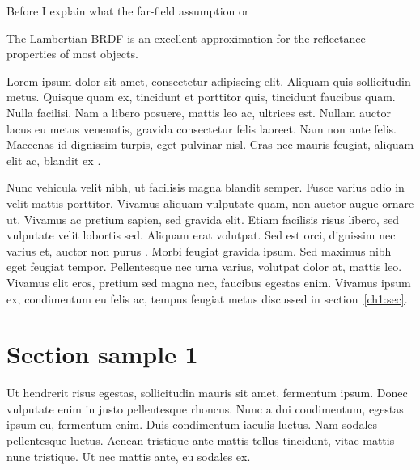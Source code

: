     Before I explain what the far-field assumption or 
    
    
    
    






    





The Lambertian BRDF is an excellent approximation for the reflectance properties of most objects.









Lorem ipsum dolor sit amet, consectetur adipiscing elit. Aliquam quis sollicitudin metus. Quisque quam ex, tincidunt et porttitor quis, tincidunt faucibus quam. Nulla facilisi. Nam a libero posuere, mattis leo ac, ultrices est. Nullam auctor lacus eu metus venenatis, gravida consectetur felis laoreet. Nam non ante felis. Maecenas id dignissim turpis, eget pulvinar nisl. Cras nec mauris feugiat, aliquam elit ac, blandit ex \cite{article-full}.

Nunc vehicula velit nibh, ut facilisis magna blandit semper. Fusce varius odio in velit mattis porttitor. Vivamus aliquam vulputate quam, non auctor augue ornare ut. Vivamus ac pretium sapien, sed gravida elit. Etiam facilisis risus libero, sed vulputate velit lobortis sed. Aliquam erat volutpat. Sed est orci, dignissim nec varius et, auctor non purus \cite{proceedings-minimal,phdthesis-full}. Morbi feugiat gravida ipsum. Sed maximus nibh eget feugiat tempor. Pellentesque nec urna varius, volutpat dolor at, mattis leo. Vivamus elit eros, pretium sed magna nec, faucibus egestas enim. Vivamus ipsum ex, condimentum eu felis ac, tempus feugiat metus discussed in section~\ref{ch1:sec}.

\section{Section sample 1}

Ut hendrerit risus egestas, sollicitudin mauris sit amet, fermentum ipsum. Donec vulputate enim in justo pellentesque rhoncus. Nunc a dui condimentum, egestas ipsum eu, fermentum enim. Duis condimentum iaculis luctus. Nam sodales pellentesque luctus. Aenean tristique ante mattis tellus tincidunt, vitae mattis nunc tristique. Ut nec mattis ante, eu sodales ex.

